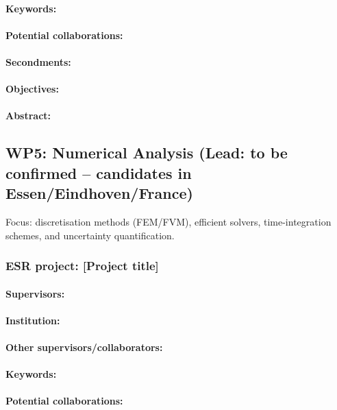 \documentclass[12pt]{article}
\begin{document}
\paragraph{Keywords:} 
\paragraph{Potential collaborations:} 
\paragraph{Secondments:} 
\paragraph{Objectives:} 
\paragraph{Abstract:} 

\subsection{WP5: Numerical Analysis (Lead: to be confirmed – candidates in Essen/Eindhoven/France)}

Focus: discretisation methods (FEM/FVM), efficient solvers, time-integration schemes, and uncertainty quantification.

\subsubsection*{ESR project: [Project title]}
\paragraph{Supervisors:} 
\paragraph{Institution:} 
\paragraph{Other supervisors/collaborators:} 
\paragraph{Keywords:} 
\paragraph{Potential collaborations:} 
\end{document}
